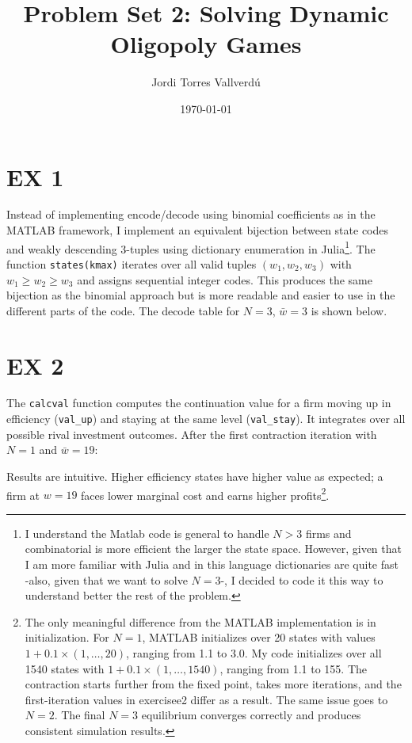 \documentclass{article}
\title{Problem Set 2: Solving Dynamic Oligopoly Games}
\author{Jordi Torres Vallverdú}
\date{\today}
\begin{document}
\maketitle

\section*{EX 1}

Instead of implementing encode/decode using binomial coefficients as in the MATLAB framework, I implement an equivalent bijection between state codes and weakly descending 3-tuples using dictionary enumeration in Julia\footnote{I understand the Matlab code is general to handle $N>3$ firms and combinatorial is more efficient the larger the state space. However, given that I am more familiar with Julia and in this language dictionaries are quite fast -also, given that we want to solve $N=3$-, I decided to code it this way to understand better the rest of the problem.}. The function \texttt{states(kmax)} iterates over all valid tuples $(w_1, w_2, w_3)$ with $w_1 \geq w_2 \geq w_3$ and assigns sequential integer codes. This produces the same bijection as the binomial approach but is more readable and easier to use in the different parts of the code. The decode table for $N=3$, $\bar{w}=3$ is shown below.



\section*{EX 2}

The \texttt{calcval} function computes the continuation value for a firm moving up in efficiency (\texttt{val\_up}) and staying at the same level (\texttt{val\_stay}). It integrates over all possible rival investment outcomes. After the first contraction iteration with $N=1$ and $\bar{w}=19$:



Results are intuitive. Higher efficiency states have higher value as expected; a firm at $w=19$ faces lower marginal cost and earns higher profits\footnote{The only meaningful difference from the MATLAB implementation 
is in initialization. For $N=1$, MATLAB initializes over 20 
states with values $1 + 0.1 \times (1,\ldots,20)$, ranging 
from 1.1 to 3.0. My code initializes over all 1540 states 
with $1 + 0.1 \times (1,\ldots,1540)$, ranging from 1.1 to 
155. The contraction starts further from the fixed point, 
takes more iterations, and the first-iteration values in 
exercisee2 differ as a result. The same issue goes to 
$N=2$. The final $N=3$ equilibrium converges correctly 
and produces consistent simulation results.}.
\end{document}
